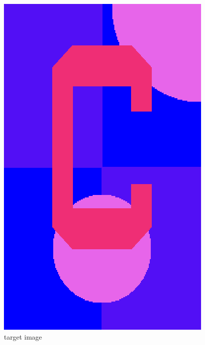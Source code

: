 \documentclass[12pt]{beamer}
\begin{document}
\begin{frame}
\begin{center}
\begin{minipage}[t]{0.2\textwidth}
\includegraphics[width=\textwidth]{c_clean.png} \\
{\small target image}
\end{minipage}
\hfill
\begin{minipage}[t]{0.2\textwidth}

\end{minipage}
\end{center}
\end{frame}
\end{document}
